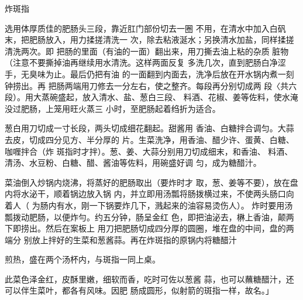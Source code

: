 \begin{recipe}{炸斑指}

\ingredients






\cooking

\step 选用体厚质佳的肥肠头三段，靠近肛门部份切去一圈 不用，在清水中加入白矾末，把肥肠放入，用力揉搓清洗一 次，除去粘液涎水；另换清水加盐，同样揉搓清洗两次。即 把肠的里面（有油的一面）翻出来，用刀撕去油上粘的杂质 脏物（注意不要撕掉油再继续用水清洗。这样两面反复 多洗几次，直到肥肠白净涩手，无臭味为止。最后仍把有油 的一面翻到内面去，洗净后放在开水锅内煮一刻钟捞出。再 把肠两端用刀修去一分左右，使之整齐。每段再分别切成两 段〈共六段）。用大蒸碗盛起，放入清水、盐、葱白三段、 料酒、花椒、姜等佐料，使水淹没过肥肠，上笼用旺火蒸三 小时，至肥肠起着绉折为适合。

\step 葱白用刀切成一寸长段，两头切成细花翻起。甜酱用 香油、白糖拌合调匀。大蒜去皮，切成四分见方、半分厚的 片。生菜洗净，用香油、醋少许、蛋黄、白糖、咖喱拌合（炸 斑指时才拌）。葱、姜、大蒜分别用刀切成细末，和香油、 料酒、清汤、水豆粉、白糖、醋、酱油等佐料，用碗盛好调 匀，成为糖醋汁。

\step 菜油倒入炒锅内烧沸，将蒸好的肥肠取出（要炸时才 取，葱、姜等不要），放在盘内将水泌干，顺着锅边放入锅 内，并立即用汤瓢将肠拨横过来，不使两头肠口向着人（ 为肠内有水，刚一下锅要炸几下，溅起来的油容易烫伤人）。 炸时要用汤瓢拨动肥肠，以便炸勻。约五分钟，肠呈金红 色，即把油泌去，楙上香油，颠两下即捞出。然后在案板上 用刀把肥肠切成四分厚的圆圈，堆在盘的中间，盘的两端分 别放上拌好的生菜和葱酱蒜。再在炸斑指的原锅内将糖醋汁

煎热，盛在两个汤杯内，与斑指一同上桌。

\notes

此菜色泽金红，皮酥里嫩，细软而香，吃时可佐以葱酱 蒜，也可以蘸糖醋汁，还可以伴生菜叶，都各有风味。因肥 肠成圆形，似射箭的斑指一样，故名。」

\end{recipe}

